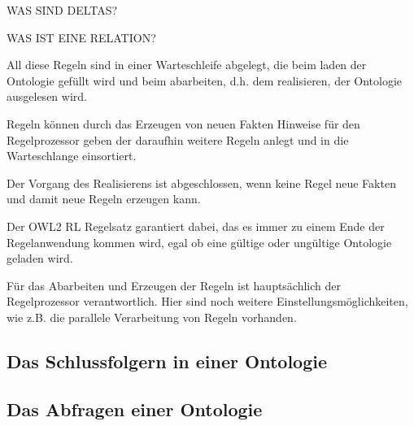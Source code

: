 WAS SIND DELTAS?


WAS IST EINE RELATION?


All diese Regeln sind in einer Warteschleife abgelegt, die beim laden der Ontologie gefüllt wird und beim abarbeiten, d.h. dem realisieren, der Ontologie ausgelesen wird.

Regeln können durch das Erzeugen von neuen Fakten Hinweise für den Regelprozessor geben der daraufhin weitere Regeln anlegt und in die Warteschlange einsortiert.

Der Vorgang des Realisierens ist abgeschlossen, wenn keine Regel neue Fakten und damit neue Regeln erzeugen kann.

Der OWL2 RL Regelsatz garantiert dabei, das es immer zu einem Ende der Regelanwendung kommen wird, egal ob eine gültige oder ungültige Ontologie geladen wird.

Für das Abarbeiten und Erzeugen der Regeln ist hauptsächlich der Regelprozessor verantwortlich. Hier sind noch weitere Einstellungsmöglichkeiten, wie z.B. die parallele Verarbeitung von Regeln vorhanden.


\subsection{Das Schlussfolgern in einer Ontologie}

\subsection{Das Abfragen einer Ontologie}


